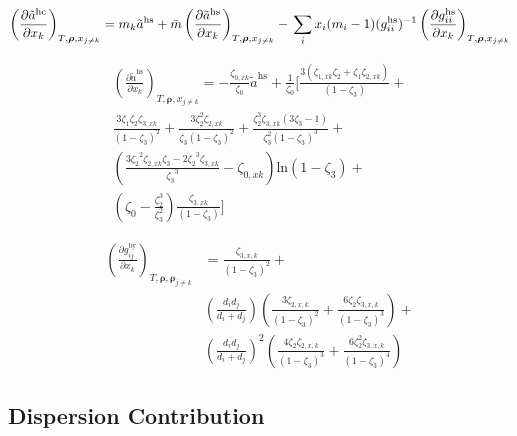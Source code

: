 \documentclass[12pt, letterpaper]{article}
\begin{document}
\begin{equation}
\left(\frac{\partial\tilde{a}^{\mathrm{hc}}}{\partial x_{k}}\right)_{T,\boldsymbol{\rho},x_{j\neq k}}=m_{k}\tilde{a}^{\mathrm{hs}}+\bar{m}\left(\frac{\partial\tilde{a}^{\mathrm{hs}}}{\partial x_{k}}\right)_{T,\boldsymbol{\rho},x_{j\neq k}}-\\\sum_{i}x_{i}(m_{i}-1)(g_{ii}^{\mathrm{hs}})^{-1}\left(\frac{\partial g_{ii}^{\mathrm{hs}}}{\partial x_{k}}\right)_{T,\boldsymbol{\rho},x_{j\neq k}}
\end{equation}

\begin{equation}
\begin{aligned}\left(\frac{\partial\tilde{a}^{\mathrm{hs}}}{\partial x_{k}}\right)_{T,\boldsymbol{\rho},x_{j\neq k}}=- \frac{\zeta_{0,xk}}{\zeta_{0}}\tilde{a}^{\mathrm{hs}}+\frac{1}{\zeta_{0}}\biggl[\frac{3(\zeta_{1,xk}\zeta_{2}+\zeta_{1}\zeta_{2,xk})}{(1-\zeta_{3})}+\\\frac{3\zeta_{1}\zeta_{2}\zeta_{3,xk}}{\left(1-\zeta_{3}\right)^{2}}+\frac{3\zeta_{2}^{2}\zeta_{2,xk}}{\zeta_{3}(1-\zeta_{3})^{2}}+\frac{\zeta_{2}^{3}\zeta_{3,xk}(3\zeta_{3}-1)}{\zeta_{3}^{2}(1-\zeta_{3})^{3}}+\\\left(\frac{3{\zeta_{2}}^{2}{\zeta_{2,xk}}{\zeta_{3}}-2{\zeta_{2}}^{3}{\zeta_{3,xk}}}{{\zeta_{3}}^{3}}-{\zeta_{0,xk}}\right)\mathrm{ln}(1-{\zeta_{3}})+\\\left(\zeta_{0}-\frac{\zeta_{2}^{3}}{\zeta_{3}^{2}}\right)\frac{\zeta_{3,xk}}{(1-\zeta_{3})}\biggr] \end{aligned}
\end{equation}

\begin{equation}
\begin{aligned}\left(\frac{\partial g_{ij}^{\mathrm{by}}}{\partial x_{k}}\right)_{T,\boldsymbol{\rho},\boldsymbol{\rho}_{j\neq k}}&=\frac{\zeta_{3,x,k}}{\left(1-\zeta_{3}\right)^{2}}+\\&\left(\frac{d_{i}d_{j}}{d_{i}+d_{j}}\right)\left(\frac{3\zeta_{2,x,k}}{(1-\zeta_{3})^{2}}+\frac{6\zeta_{2}\zeta_{3,x,k}}{(1-\zeta_{3})^{3}}\right)+\\&\left(\frac{d_{i}d_{j}}{d_{i}+d_{j}}\right)^{2}\left(\frac{4\zeta_{2}\zeta_{2,x,k}}{(1-\zeta_{3})^{3}}+\frac{6\zeta_{2}^{2}\zeta_{3,x,k}}{(1-\zeta_{3})^{4}}\right)\end{aligned}
\end{equation}

\subsection{Dispersion Contribution}
\end{document}

